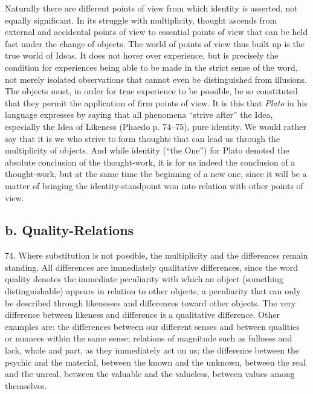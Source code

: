 \documentclass[12pt,a4paper]{book}
\newcommand{\opage}[1]{\marginnote{\footnotesize\textit{[#1]}}}
\begin{document}
Naturally there are different points of view from which identity is asserted,
not equally significant. In its struggle with multiplicity, thought ascends
from external and accidental points of view to essential points of view that
can be held fast under the change of objects. The world of points of view
thus built up is the true world of Ideas. It does not hover over experience,
but is precisely the condition for experiences being able to be made in the
strict sense of the word, not merely isolated observations that cannot even
be distinguished from illusions. The objects must, in order for true
experience to be possible, be so constituted that they permit the
application of firm points of view. It is this that \emph{Plato} in his
language expresses by saying that all phenomena ``strive after'' the Idea,
especially the Idea of Likeness (Phaedo p. 74--75), pure identity. We
would rather say that it is we who strive to form thoughts that can lead us
through the multiplicity of objects. And while identity (``the One'') for
Plato denoted the absolute conclusion of the thought-work, it is for us
indeed the conclusion of a thought-work, but at the same time the beginning
of a new one, since it will be a matter of bringing the identity-standpoint
won into relation with other points of view.

\subsection*{b. Quality-Relations}

74. Where substitution is not possible, the multiplicity and the differences
remain standing. All differences are \opage{181}immediately qualitative differences,
since the word quality denotes the immediate peculiarity with which an
object (something distinguishable) appears in relation to other objects, a
peculiarity that can only be described through likenesses and differences
toward other objects. The very difference between likeness and difference is
a qualitative difference. Other examples are: the differences between our
different senses and between qualities or nuances within the same sense;
relations of magnitude such as fullness and lack, whole and part, as they
immediately act on us; the difference between the psychic and the material,
between the known and the unknown, between the real and the unreal, between
the valuable and the valueless, between values among themselves.
\end{document}
